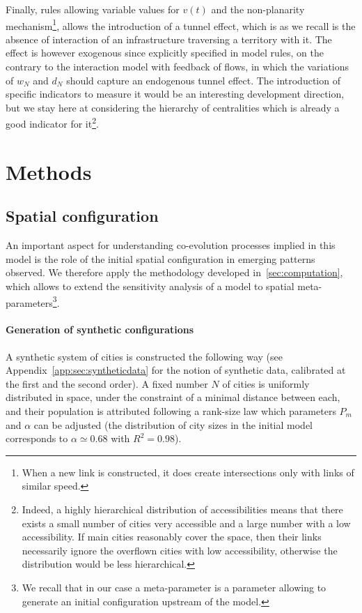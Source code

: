 Finally, rules allowing variable values for $v(t)$ and the non-planarity mechanism\footnote{When a new link is constructed, it does create intersections only with links of similar speed.}, allows the introduction of a tunnel effect, which is as we recall is the absence of interaction of an infrastructure traversing a territory with it. The effect is however exogenous since explicitly specified in model rules, on the contrary to the interaction model with feedback of flows, in which the variations of $w_N$ and $d_N$ should capture an endogenous tunnel effect. The introduction of specific indicators to measure it would be an interesting development direction, but we stay here at considering the hierarchy of centralities which is already a good indicator for it\footnote{Indeed, a highly hierarchical distribution of accessibilities means that there exists a small number of cities very accessible and a large number with a low accessibility. If main cities reasonably cover the space, then their links necessarily ignore the overflown cities with low accessibility, otherwise the distribution would be less hierarchical.}.



\section{Methods}

\subsection{Spatial configuration}


An important aspect for understanding co-evolution processes implied in this model is the role of the initial spatial configuration in emerging patterns observed. We therefore apply the methodology developed in~\ref{sec:computation}, which allows to extend the sensitivity analysis of a model to spatial meta-parameters\footnote{We recall that in our case a meta-parameter is a parameter allowing to generate an initial configuration upstream of the model.}.


\paragraph{Generation of synthetic configurations}

A synthetic system of cities is constructed the following way (see Appendix~\ref{app:sec:syntheticdata} for the notion of synthetic data, calibrated at the first and the second order). A fixed number $N$ of cities is uniformly distributed in space, under the constraint of a minimal distance between each, and their population is attributed following a rank-size law which parameters $P_{m}$ and $\alpha$ can be adjusted (the distribution of city sizes in the initial model corresponds to $\alpha\simeq 0.68$ with $R^2=0.98$).



